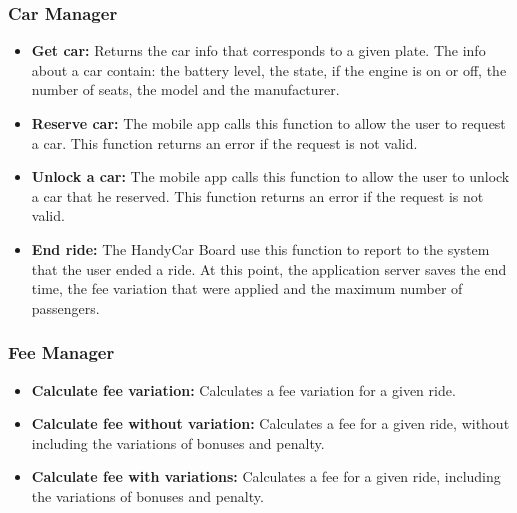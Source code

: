 \subsubsection{Car Manager}
\begin{itemize}
	\item \textbf{Get car:} Returns the car info that corresponds to a given plate.
	The info about a car contain: the battery level, the state, if the engine is on or off, the number of seats,  the model and the manufacturer.
	\item \textbf{Reserve car:} The mobile app calls this function to allow the user to request a car. This function returns an error if the request is not valid.
	\item \textbf{Unlock a car:} The mobile app calls this function to allow the user to unlock a car that he reserved. This function returns an error if the request is not valid.
	\item \textbf{End ride:} The HandyCar Board use this function to report to the system that the user ended a ride. At this point, the application server saves the end time, the fee variation that were applied and the maximum number of passengers.
\end{itemize}

\subsubsection{Fee Manager}
\begin{itemize}
	\item \textbf{Calculate fee variation:} Calculates a fee variation for a given ride. 
	\item \textbf{Calculate fee without variation:} Calculates a fee for a given ride, without including the variations of bonuses and penalty.
	\item \textbf{Calculate fee with variations:} Calculates a fee for a given ride, including the variations of bonuses and penalty.
\end{itemize}
